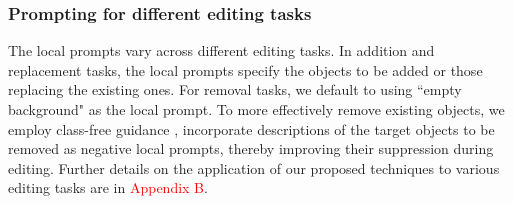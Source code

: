 \documentclass{article}
\begin{document}
\subsubsection{Prompting for different editing tasks}

The local prompts vary across different editing tasks. In addition and replacement tasks, the local prompts specify the objects to be added or those replacing the existing ones. For removal tasks, we default to using ``empty background" as the local prompt. To more effectively remove existing objects, we employ class-free guidance \citep{ho2022classifier}, incorporate descriptions of the target objects to be removed as negative local prompts, thereby improving their suppression during editing. Further details on the application of our proposed techniques to various editing tasks are in \textcolor{red}{Appendix B}.





\end{document}
